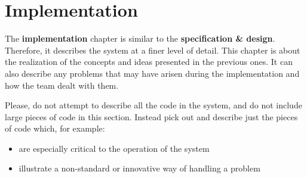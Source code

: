 
\chapter{Implementation}\label{ch:implementation}

The \textbf{implementation} chapter is similar to the \textbf{specification \& design}. Therefore, it describes the system at a finer level of detail. This chapter is about the realization of the concepts and ideas presented in the previous ones. It can also describe any problems that may have arisen during the implementation and how the team dealt with them.

Please, do not attempt to describe all the code in the system, and do not include large pieces of code in this section. Instead pick out and describe just the pieces of code which, for example:

\begin{itemize}
	\item are especially critical to the operation of the system
	\item illustrate a non-standard or innovative way of handling a problem
\end{itemize}